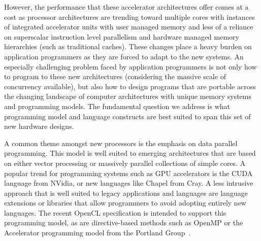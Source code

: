
However, the performance that these accelerator architectures offer
comes at a cost as processor architectures are trending toward
multiple cores with instances of integrated accelerator units with
user managed memory and less of a reliance on superscalar instruction
level parallelism and hardware managed memory hierarchies (such as
traditional caches).  These changes place a heavy burden on
application programmers as they are forced to adapt to the new
systems.  An especially challenging problem faced by application
programmers is not only how to program to these new architectures
(considering the massive scale of concurrency available), but also how
to design programs that are portable across the changing landscape of
computer architectures with unique memory systems and programming
models.  The fundamental question we address is what programming model
and language constructs are best suited to span this set of new
hardware designs.


A common theme amongst new processors is the emphasis on data parallel
programming.  This model is well suited to emerging architectures that
are based on either vector processing or massively parallel
collections of simple cores.  A popular trend for programming systems
such as GPU accelerators is the CUDA language from NVidia, or new
languages like Chapel from Cray.  A less intrusive approach that is
well suited to legacy applications and languages are language
extensions or libraries that allow programmers to avoid adopting
entirely new languages.  The recent OpenCL specification is intended
to support this programming model, as are directive-based methods such
as OpenMP or the Accelerator programming model from the Portland
Group~\cite{pgi10accelerator}.


